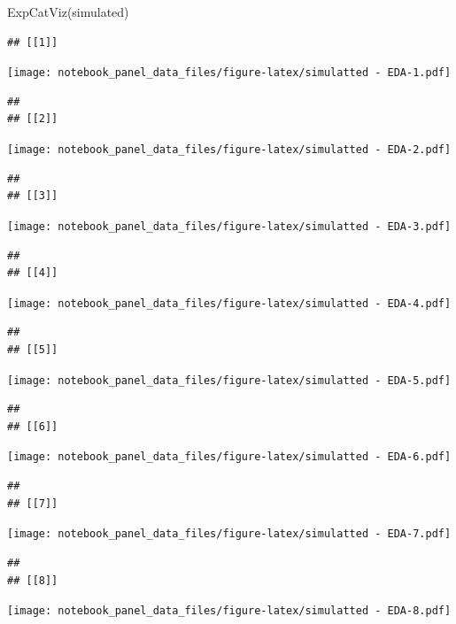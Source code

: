 \documentclass[
]{article}
\newenvironment{Shaded}{\begin{snugshade}}{\end{snugshade}}
\newcommand{\FunctionTok}[1]{\textcolor[rgb]{0.00,0.00,0.00}{#1}}
\newcommand{\NormalTok}[1]{#1}
\begin{document}
\begin{Shaded}
\begin{Highlighting}[]
  \FunctionTok{ExpCatViz}\NormalTok{(simulated)}
\end{Highlighting}
\end{Shaded}

\begin{verbatim}
## [[1]]
\end{verbatim}

\texttt{[image: notebook\_panel\_data\_files/figure-latex/simulatted - EDA-1.pdf]}

\begin{verbatim}
## 
## [[2]]
\end{verbatim}

\texttt{[image: notebook\_panel\_data\_files/figure-latex/simulatted - EDA-2.pdf]}

\begin{verbatim}
## 
## [[3]]
\end{verbatim}

\texttt{[image: notebook\_panel\_data\_files/figure-latex/simulatted - EDA-3.pdf]}

\begin{verbatim}
## 
## [[4]]
\end{verbatim}

\texttt{[image: notebook\_panel\_data\_files/figure-latex/simulatted - EDA-4.pdf]}

\begin{verbatim}
## 
## [[5]]
\end{verbatim}

\texttt{[image: notebook\_panel\_data\_files/figure-latex/simulatted - EDA-5.pdf]}

\begin{verbatim}
## 
## [[6]]
\end{verbatim}

\texttt{[image: notebook\_panel\_data\_files/figure-latex/simulatted - EDA-6.pdf]}

\begin{verbatim}
## 
## [[7]]
\end{verbatim}

\texttt{[image: notebook\_panel\_data\_files/figure-latex/simulatted - EDA-7.pdf]}

\begin{verbatim}
## 
## [[8]]
\end{verbatim}

\texttt{[image: notebook\_panel\_data\_files/figure-latex/simulatted - EDA-8.pdf]}
\end{document}
